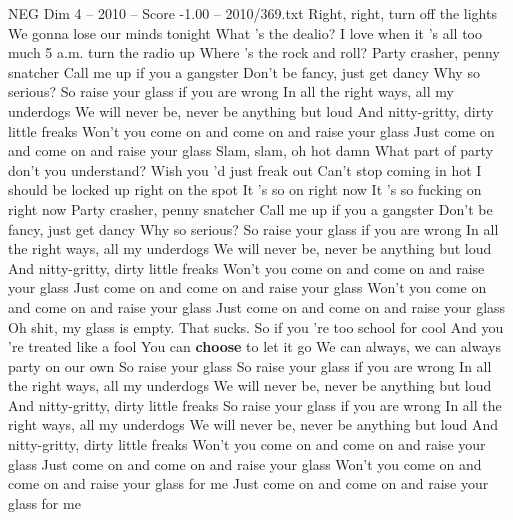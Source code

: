 \begin{textsample}{NEG Dim 4 – 2010 – Score -1.00 – 2010/369.txt}  \label{ex:f4_neg_017}
Right, right, turn off the lights We gonna lose our minds tonight What 's the dealio?
I love when it 's all too much 5 a.m. turn the radio up Where 's the rock and roll?
Party crasher, penny snatcher Call me up if you a gangster Don't be fancy, just get dancy Why so serious?
So raise your glass if you are wrong In all the right ways, all my underdogs We will never be, never be anything but loud And nitty-gritty, dirty little freaks Won't you come on and come on and raise your glass Just come on and come on and raise your glass Slam, slam, oh hot damn What part of party don't you understand?
Wish you 'd just freak out Can't stop coming in hot I should be locked up right on the spot It 's so on right now It 's so fucking on right now Party crasher, penny snatcher Call me up if you a gangster Don't be fancy, just get dancy Why so serious?
So raise your glass if you are wrong In all the right ways, all my underdogs We will never be, never be anything but loud And nitty-gritty, dirty little freaks Won't you come on and come on and raise your glass Just come on and come on and raise your glass Won't you come on and come on and raise your glass Just come on and come on and raise your glass Oh shit, my glass is empty.
That sucks.
So if you 're too school for cool And you 're treated like a fool You can \textbf{choose} to let it go We can always, we can always party on our own So raise your glass So raise your glass if you are wrong In all the right ways, all my underdogs We will never be, never be anything but loud And nitty-gritty, dirty little freaks So raise your glass if you are wrong In all the right ways, all my underdogs We will never be, never be anything but loud And nitty-gritty, dirty little freaks Won't you come on and come on and raise your glass Just come on and come on and raise your glass Won't you come on and come on and raise your glass for me Just come on and come on and raise your glass for me

\end{textsample}
